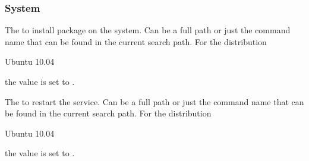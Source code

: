 \subsubsection*{System}


The  to install package on the system. Can be a full path or
just the command name that can be found in the current search path. 
For the distribution
\begin{inparaitem}
\item[\TheDistribution{ubuntu}] Ubuntu 10.04
\end{inparaitem}
the value is set to .


The  to restart the service. Can be a full path or
just the command name that can be found in the current search path. 
For the distribution
\begin{inparaitem}
\item[\TheDistribution{ubuntu}] Ubuntu 10.04
\end{inparaitem}
the value is set to .


